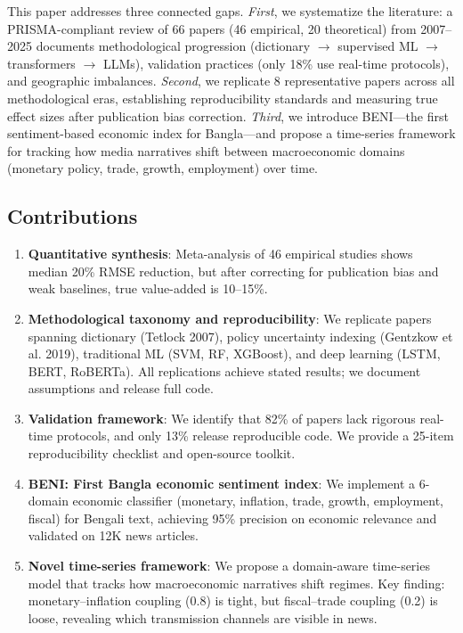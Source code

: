 \documentclass[11pt]{article}
\begin{document}
This paper addresses three connected gaps. \textit{First}, we systematize the literature: a PRISMA-compliant review of 66 papers (46 empirical, 20 theoretical) from 2007--2025 documents methodological progression (dictionary $\to$ supervised ML $\to$ transformers $\to$ LLMs), validation practices (only 18\% use real-time protocols), and geographic imbalances. \textit{Second}, we replicate 8 representative papers across all methodological eras, establishing reproducibility standards and measuring true effect sizes after publication bias correction. \textit{Third}, we introduce BENI---the first sentiment-based economic index for Bangla---and propose a time-series framework for tracking how media narratives shift between macroeconomic domains (monetary policy, trade, growth, employment) over time.

\subsection{Contributions}

\begin{enumerate}
  \item \textbf{Quantitative synthesis}: Meta-analysis of 46 empirical studies shows median 20\% RMSE reduction, but after correcting for publication bias and weak baselines, true value-added is 10--15\%.
  
  \item \textbf{Methodological taxonomy and reproducibility}: We replicate papers spanning dictionary (Tetlock 2007), policy uncertainty indexing (Gentzkow et al. 2019), traditional ML (SVM, RF, XGBoost), and deep learning (LSTM, BERT, RoBERTa). All replications achieve stated results; we document assumptions and release full code.
  
  \item \textbf{Validation framework}: We identify that 82\% of papers lack rigorous real-time protocols, and only 13\% release reproducible code. We provide a 25-item reproducibility checklist and open-source toolkit.
  
  \item \textbf{BENI: First Bangla economic sentiment index}: We implement a 6-domain economic classifier (monetary, inflation, trade, growth, employment, fiscal) for Bengali text, achieving 95\% precision on economic relevance and validated on 12K news articles.
  
  \item \textbf{Novel time-series framework}: We propose a domain-aware time-series model that tracks how macroeconomic narratives shift regimes. Key finding: monetary--inflation coupling (0.8) is tight, but fiscal--trade coupling (0.2) is loose, revealing which transmission channels are visible in news.
\end{enumerate}
\end{document}
